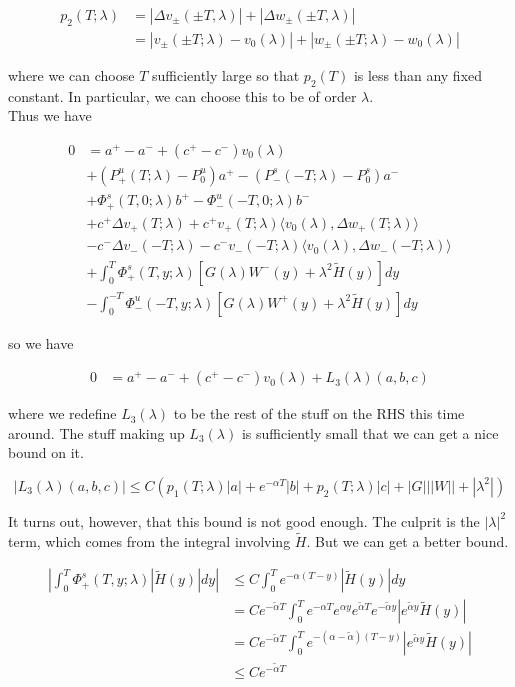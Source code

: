 \documentclass[12pt]{article}
\begin{document}
\begin{enumerate}
\begin{align*}
p_2(T; \lambda) &= |\Delta v_\pm(\pm T, \lambda)| + |\Delta w_\pm(\pm T, \lambda)|\\
&= |v_\pm(\pm T; \lambda) - v_0(\lambda)| + |w_\pm(\pm T; \lambda) - w_0(\lambda)|
\end{align*}

where we can choose $T$ sufficiently large so that $p_2(T)$ is less than any fixed constant. In particular, we can choose this to be of order $\lambda$.\\

Thus we have

\begin{align*}
0 &= a^+ - a^- + (c^+ - c^-)v_0(\lambda) \\
&+ (P^u_+(T; \lambda) - P_0^u)a^+ - (P^s_-(-T; \lambda) - P_0^s)a^- \\
&+ \Phi^s_+(T, 0; \lambda)b^+ - \Phi^u_-(-T, 0; \lambda)b^- \\
&+ c^+ \Delta v_+(T; \lambda) + c^+ v_+(T; \lambda) \langle v_0(\lambda), \Delta w_+(T; \lambda) \rangle \\
&- c^- \Delta v_-(-T; \lambda) - c^- v_-(-T; \lambda) \langle v_0(\lambda), \Delta w_-(-T; \lambda) \rangle \\
&+ \int_0^{T} \Phi^s_+(T, y; \lambda) [ G(\lambda)W^-(y) + \lambda^2 \tilde{H}(y) ] dy \\
&- \int_0^{-T} \Phi^u_-(-T, y; \lambda) [ G(\lambda)W^+(y) + \lambda^2 \tilde{H}(y) ] dy
\end{align*}

so we have

\begin{align*}
0 &= a^+ - a^- + (c^+ - c^-)v_0(\lambda) + L_3(\lambda)(a, b, c)
\end{align*}

where we redefine $L_3(\lambda)$ to be the rest of the stuff on the RHS this time around. The stuff making up $L_3(\lambda)$ is sufficiently small that we can get a nice bound on it. 

\[
|L_3(\lambda)(a, b, c)| \leq C ( p_1(T; \lambda)|a|
+ e^{-\alpha T}|b| + p_2(T; \lambda)|c| + |G|||W|| + |\lambda^2| )
\]

It turns out, however, that this bound is not good enough. The culprit is the $|\lambda|^2$ term, which comes from the integral involving $\tilde{H}$. But we can get a better bound.

\begin{align*}
\left| \int_0^T \Phi^s_+(T, y; \lambda) |\tilde{H}(y)| dy \right| 
&\leq C \int_0^T e^{-\alpha (T - y)}|\tilde{H}(y)| dy \\
&= C e^{-\tilde{\alpha}T} \int_0^T e^{-\alpha T} e^{\alpha y}  e^{\tilde{\alpha}T} e^{-\tilde{\alpha}y} |e^{\tilde{\alpha}y} \tilde{H}(y)| \\
&= C e^{-\tilde{\alpha}T} \int_0^T e^{-(\alpha - \tilde{\alpha})(T-y)} |e^{\tilde{\alpha}y} \tilde{H}(y)|\\
&\leq C e^{-\tilde{\alpha}T} 
\end{align*}


\end{enumerate}
\end{document}
